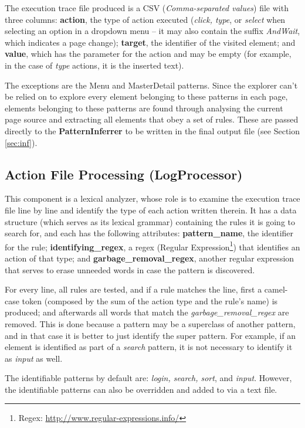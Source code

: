 \documentclass[conference]{IEEEtran}
\begin{document}
The execution trace file produced is a CSV (\textit{Comma-separated values}) file with three columns: \textbf{action}, the type of action executed (\textit{click, type}, or \textit{select} when selecting an option in a dropdown menu -- it may also contain the suffix \textit{AndWait}, which indicates a page change); \textbf{target}, the identifier of the visited element; and \textbf{value}, which has the parameter for the action and may be empty (for example, in the case of \textit{type} actions, it is the inserted text).

The exceptions are the Menu and MasterDetail patterns. Since the explorer can't be relied on to explore every element belonging to these patterns in each page, elements belonging to these patterns are found through analysing the current page source and extracting all elements that obey a set of rules. These are passed directly to the \textbf{PatternInferrer} to be written in the final output file (see Section \ref{sec:inf}).

\subsection{Action File Processing (LogProcessor)}\label{sec:fp}

This component is a lexical analyzer, whose role is to examine the execution trace file line by line and identify the type of each action written therein. It has a data structure (which serves as its lexical grammar) containing the rules it is going to search for, and each has the following attributes: \textbf{pattern\_name}, the identifier for the rule; \textbf{identifying\_regex}, a regex (Regular Expression\footnote{Regex: \url{http://www.regular-expressions.info/}}) that identifies an action of that type; and \textbf{garbage\_removal\_regex}, another regular expression that serves to erase unneeded words in case the pattern is discovered. 

For every line, all rules are tested, and if a rule matches the line, first a camel-case token (composed by the sum of the action type and the rule's name) is produced; and afterwards all words that match the \textit{garbage\_removal\_regex} are removed. This is done because a pattern may be a superclass of another pattern, and in that case it is better to just identify the super pattern. For example, if an element is identified as part of a \textit{search} pattern, it is not necessary to identify it as \textit{input} as well.

The identifiable patterns by default are: \textit{login, search, sort}, and \textit{input}. However, the identifiable patterns can also be overridden and added to via a text file.
\end{document}
